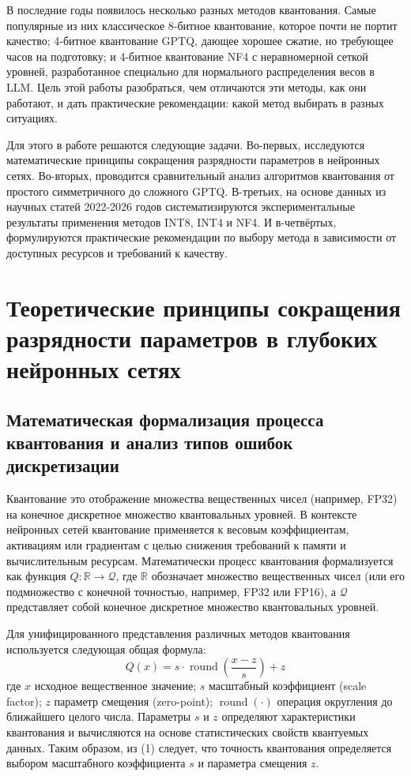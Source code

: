 \documentclass[bachelor, och, coursework]{SCWorks}
\begin{document}
	В последние годы появилось несколько разных методов квантования. Самые популярные из них классическое 8-битное квантование, которое почти не портит качество; 4-битное квантование GPTQ, дающее хорошее сжатие, но требующее часов на подготовку; и 4-битное квантование NF4 с неравномерной сеткой уровней, разработанное специально для нормального распределения весов в LLM. Цель этой работы разобраться, чем отличаются эти методы, как они работают, и дать практические рекомендации: какой метод выбирать в разных ситуациях.
	
	Для этого в работе решаются следующие задачи. Во-первых, исследуются математические принципы сокращения разрядности параметров в нейронных сетях. Во-вторых, проводится сравнительный анализ алгоритмов квантования от простого симметричного до сложного GPTQ. В-третьих, на основе данных из научных статей 2022-2026 годов систематизируются экспериментальные результаты применения методов INT8, INT4 и NF4. И в-четвёртых, формулируются практические рекомендации по выбору метода в зависимости от доступных ресурсов и требований к качеству.
	
	\section{Теоретические принципы сокращения разрядности параметров в глубоких нейронных сетях}
	
	\subsection{Математическая формализация процесса квантования и анализ типов ошибок дискретизации}
	
	Квантование это отображение множества вещественных чисел (например, FP32) на конечное дискретное множество квантовальных уровней. В контексте нейронных сетей квантование применяется к весовым коэффициентам, активациям или градиентам с целью снижения требований к памяти и вычислительным ресурсам. Математически процесс квантования формализуется как функция \(Q: \mathbb{R} \to \mathcal{Q}\), где \(\mathbb{R}\) обозначает множество вещественных чисел (или его подмножество с конечной точностью, например, FP32 или FP16), а \(\mathcal{Q}\) представляет собой конечное дискретное множество квантовальных уровней.
	
	Для унифицированного представления различных методов квантования используется следующая общая формула:
	\[
	Q(x) = s \cdot \operatorname{round}\left(\frac{x - z}{s}\right) + z \tag{1}
	\]
	где \(x\) исходное вещественное значение; \(s\) масштабный коэффициент (scale factor); \(z\) параметр смещения (zero-point); \(\operatorname{round}(\cdot)\) операция округления до ближайшего целого числа. Параметры \(s\) и \(z\) определяют характеристики квантования и вычисляются на основе статистических свойств квантуемых данных. Таким образом, из (1) следует, что точность квантования определяется выбором масштабного коэффициента \(s\) и параметра смещения \(z\).
	
\end{document}

